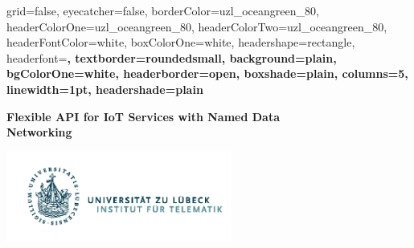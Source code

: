 \documentclass[a0paper,portrait]{baposter}
\begin{document}



\background{
}

\begin{poster}{
	grid=false,
	eyecatcher=false, 
	borderColor=uzl_oceangreen_80,
	headerColorOne=uzl_oceangreen_80,
	headerColorTwo=uzl_oceangreen_80,
	headerFontColor=white,
	boxColorOne=white,
	headershape=rectangle,
	headerfont=\large\bf,
	textborder=roundedsmall,
	background=plain,
	bgColorOne=white,
	headerborder=open,
	boxshade=plain,
	columns=5,
	linewidth=1pt,
	headershade=plain
}
{
}
{
	\vspace{0.3cm}
	\begin{minipage}{\linewidth}
	  \textcolor{uzl_oceangreen_80}{\textbf{Flexible API for IoT Services with Named Data}} \\
	  \textcolor{uzl_oceangreen_80}{\textbf{Networking}}
	\end{minipage}
	\vspace{0.3cm}
}
{
  \textcolor{uzl_orange_2}{\textsf{}}
}
{
  \hspace{1cm}
  \includegraphics[height=8em]{Logo_Inst_Telematik_orig}
}


\end{poster}
\end{document}
